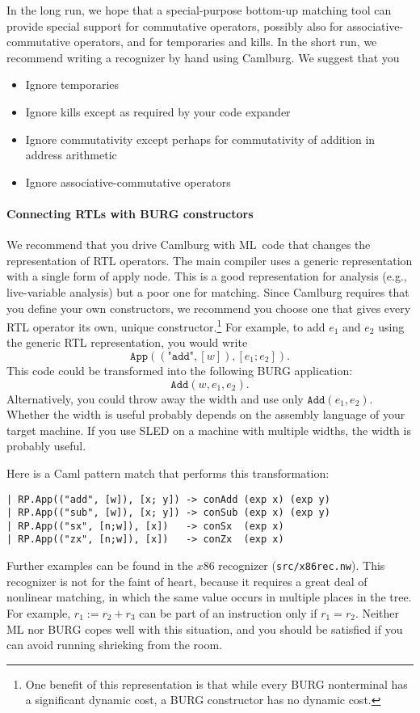 \documentclass[12pt]{article}
\renewcommand\gets{\mathrel{:=}}
\begin{document}
In the long run, we hope that a special-purpose bottom-up matching
tool can provide special support for commutative operators, possibly
also for
associative-commutative operators, and for
temporaries and kills.
In the short run, we recommend writing a recognizer by hand using
Camlburg.
We suggest that you
\begin{itemize}
\item
Ignore temporaries
\item
Ignore kills except as required by your code expander
\item
Ignore commutativity except perhaps for commutativity of addition in
address arithmetic
\item
Ignore associative-commutative operators
\end{itemize}

\paragraph{Connecting RTLs with BURG constructors}

We recommend that you drive Camlburg with ML~code that changes
the representation of RTL operators.
The main compiler uses a generic representation with a single form of
apply node.
This is a good representation for analysis (e.g., live-variable
analysis) but a poor one for matching.
Since Camlburg requires that you define your own constructors, we
recommend you choose one that gives every RTL operator its own, unique
constructor.\footnote
{One benefit of this representation is that while every BURG
nonterminal has a significant dynamic cost, a BURG constructor has no
dynamic cost.}
For example, to add $e_1$ and $e_2$ using the generic RTL
representation, you would write
$$\texttt{App}((\texttt{"add"}, [w]), [e_1; e_2]).$$
This code could be transformed into the following BURG application:
$$\texttt{Add}(w, e_1, e_2).$$
Alternatively, you could throw away the width and use only 
$\texttt{Add}(e_1, e_2)$.
Whether the width is useful probably depends on the assembly language
of your target machine.
If you use SLED on a machine with multiple widths, the width is
probably useful.

Here is a Caml pattern match that performs this transformation:
\begin{verbatim}
| RP.App(("add", [w]), [x; y]) -> conAdd (exp x) (exp y)
| RP.App(("sub", [w]), [x; y]) -> conSub (exp x) (exp y)
| RP.App(("sx", [n;w]), [x])   -> conSx  (exp x)
| RP.App(("zx", [n;w]), [x])   -> conZx  (exp x)
\end{verbatim}
Further examples can be found in the $x$86 recognizer (\texttt{src/x86rec.nw}).
This recognizer is not for the faint of heart, because it requires a
great deal of nonlinear matching, in which the same value occurs in
multiple places in the tree.
For example, $r_1 \gets r_2 + r_3$ can be part of an instruction only
if $r_1 = r_2$.
Neither ML nor BURG copes well with this situation, and you should be
satisfied if you can avoid running shrieking from the room.
\end{document}
